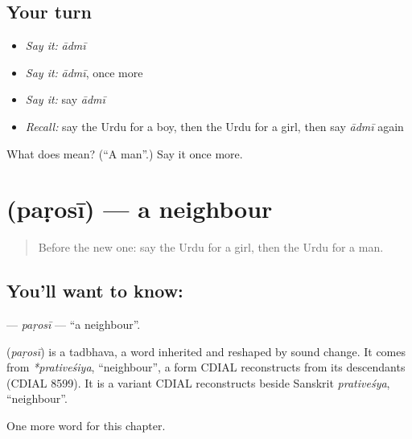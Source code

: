 \subsection*{Your turn}
\begin{itemize}
\raggedright
  \item \emph{Say it:} \emph{ādmī}
  \item \emph{Say it:} \emph{ādmī}, once more
  \item \emph{Say it:} say \emph{ādmī}
  \item \emph{Recall:} say the Urdu for a boy, then the Urdu for a girl, then say \emph{ādmī} again
\end{itemize}

\begin{tcolorbox}[breakable,colback=teal!4,colframe=teal!35!black,title={Before you move on}]
What does  mean? (\textquotedblleft{}A man\textquotedblright{}.) Say it once more.
\end{tcolorbox}
\section[\texorpdfstring{\ur{پڑوسی} (paṛosī)}{پڑوسی (paṛosī)}]{ (paṛosī) — a neighbour}

\label{lesson:UR-C45-parosi}



\begin{quote}
Before the new one: say the Urdu for a girl, then the Urdu for a man.
\end{quote}

\subsection*{You'll want to know: }
\textbf{} — \emph{paṛosī} — \textquotedblleft{}a neighbour\textquotedblright{}.

\begin{cousinweb}
\textbf{} (\emph{paṛosī}) is a tadbhava, a word inherited and reshaped by sound change. It comes from \emph{*prativeśiya}, \textquotedblleft{}neighbour\textquotedblright{}, a form CDIAL reconstructs from its descendants (CDIAL 8599). It is a variant CDIAL reconstructs beside Sanskrit \emph{prativeśya}, \textquotedblleft{}neighbour\textquotedblright{}.
\end{cousinweb}

\begin{grammarlens}[title={What you've built}]
One more word for this chapter.
\end{grammarlens}

